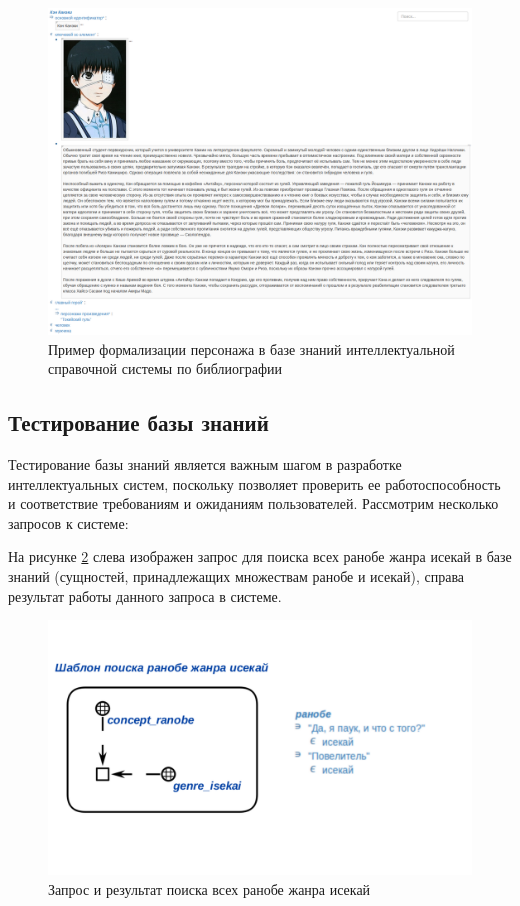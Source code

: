 \begin{figure}[H]
    \centering
    \includegraphics[scale=0.37]{imgs/character_example.png}
    \caption{Пример формализации персонажа в базе знаний интеллектуальной справочной системы по библиографии}
    \label{fig:character_example}
\end{figure}

\subsection{Тестирование базы знаний}

Тестирование базы знаний является важным шагом в разработке интеллектуальных систем, поскольку позволяет проверить ее работоспособность и соответствие требованиям и ожиданиям пользователей. Рассмотрим несколько запросов к системе:

На рисунке \ref{fig:search_isekai} слева изображен запрос для поиска всех ранобе жанра исекай в базе знаний (сущностей, принадлежащих множествам ранобе и исекай), справа результат работы данного запроса в системе.

\begin{figure}[H]
    \centering
    \includegraphics[scale=0.13,trim={0 15cm 0cm 15cm},clip]{imgs/isekai_ranobe_qr.png}
    \caption{Запрос и результат поиска всех ранобе жанра исекай}
    \label{fig:search_isekai}
\end{figure}

